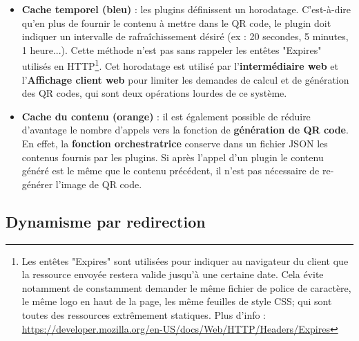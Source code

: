 \documentclass[a4paper,12pt]{article}
\begin{document}
\begin{itemize}

  \item \textbf{Cache temporel (bleu)} : les plugins définissent un horodatage. C'est-à-dire qu'en plus de fournir le contenu à mettre dans le QR code, le plugin doit indiquer un intervalle de rafraîchissement désiré (ex : 20 secondes, 5 minutes, 1 heure...). Cette méthode n'est pas sans rappeler les entêtes "Expires" utilisés en HTTP\footnote{Les entêtes "Expires" sont utilisées pour indiquer au navigateur du client que la ressource envoyée restera valide jusqu'à une certaine date. Cela évite notamment de constamment demander le même fichier de police de caractère, le même logo en haut de la page, les même feuilles de style CSS; qui sont toutes des ressources extrêmement statiques. Plus d'info : \url{https://developer.mozilla.org/en-US/docs/Web/HTTP/Headers/Expires}}. Cet horodatage est utilisé par l'\textbf{intermédiaire web} et l'\textbf{Affichage client web} pour limiter les demandes de calcul et de génération des QR codes, qui sont deux opérations lourdes de ce système.\\
  \newpage
  \item \textbf{Cache du contenu (orange)} : il est également possible de réduire d'avantage le nombre d'appels vers la fonction de \textbf{génération de QR code}. En effet, la \textbf{fonction orchestratrice} conserve dans un fichier JSON les contenus fournis par les plugins. Si après l'appel d'un plugin le contenu généré est le même que le contenu précédent, il n'est pas nécessaire de re-générer l'image de QR code.\\
  
\end{itemize}
\subsection{Dynamisme par redirection}
\end{document}
